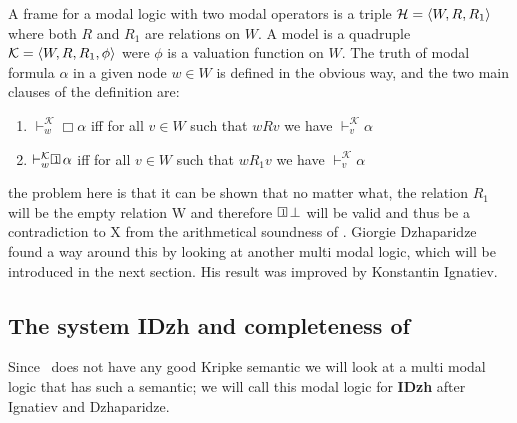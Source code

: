 \documentclass[../main.tex]{subfiles}
\begin{document}
\begin{defi}
	A  frame for a modal logic with two modal operators is a triple
	$\mathcal{H}=\langle W,R,R_1\rangle$ where both $R$ and $R_1$ are relations on
	$W$. A model is a quadruple $\mathcal{K}=\langle W, R,R_1,\phi\rangle$ were
	$\phi$ is a valuation function on $W$. The truth of modal formula
	$\alpha$ in a given node $w\in W$ is defined in the obvious way, and
	the two main clauses of the definition are:
	\begin{enumerate}
		\item $\vdash_w^\mathcal{K}\Box\alpha$ iff for all $v\in W$ such
			that $wRv$ we have $\vdash_v^\mathcal{K}\alpha$
		\item $\vdash_w^\mathcal{K}\OneBox\alpha$ iff for all $v\in W$ such
			that $wR_1v$ we have $\vdash_v^\mathcal{K}\alpha$
	\end{enumerate}
\end{defi}
the problem here is that it can be shown that no matter what, the relation
$R_1$ 
will be the empty relation W and therefore $\OneBox\bot$  will be valid and thus be a 
contradiction to X from the arithmetical soundness of \GLB. Giorgie
Dzhaparidze found a way around this by looking at another multi modal logic,
which will be introduced in the next section. His result was improved  by
Konstantin Ignatiev.

\subsection{The system \textbf{IDzh} and completeness of \GLB}

Since \GLB\ does not have any good Kripke semantic we will look at a multi modal logic that
has such a semantic; we will call this modal logic for \textbf{IDzh} after Ignatiev
and Dzhaparidze.
\end{document}
